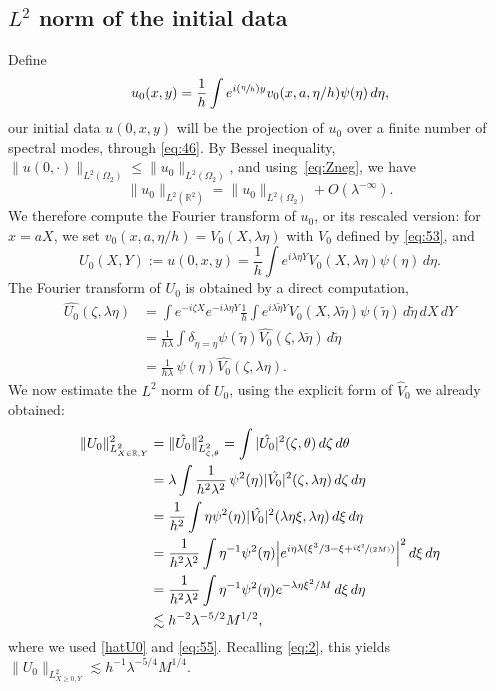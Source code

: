 \documentclass[JEP,XML,SOM,Unicode,NoEqCountersInSection,NoFloatCountersInSection,published]{cedram}
\newcommand{\Psfrac}[2]{(\sfrac{#1}{#2})}
\newcommand{\spfrac}[2]{\sfrac{#1}{(#2)}}
\newcommand\R{{\mathbb R}}
\theoremstyle{plain}
\theoremstyle{definition}
\begin{document}
\subsection{$L^2$ norm of the initial data}
Define
\[
u_{0}(x,y)=\frac 1h\int e^{i\Psfrac{\eta}{h}y}v_0(x,a,\eta/h)\psi(\eta)\,d\eta,
\]
our initial data $u(0,x,y)$ will be the projection of $u_{0}$ over a finite number of spectral modes, through \eqref{eq:46}. By Bessel inequality, $\| u(0,\cdot)\|_{L^{2}(\Omega_{2})} \leq \| u_{0}\|_{L^{2}(\Omega_{2})}$, and using~\eqref{eq:Zneg}, we have
\begin{equation}
\label{eq:2}
\|u_{0}\|_{L^{2}(\R^{2})}=\| u_{0}\|_{L^{2}(\Omega_{2})}+O(\lambda^{-\infty}).
\end{equation}
We therefore compute the Fourier transform of $u_{0}$, or its rescaled version: for $x=aX$, we set $v_0(x,a,\eta/h)=V_0(X,\lambda\eta)$ with $V_{0}$ defined by \eqref{eq:53}, and
\[
U_0(X,Y):=u(0,x,y)=\frac 1h \int e^{i\lambda \eta Y}V_0(X,\lambda \eta)\psi(\eta)\,d\eta.
\]
The Fourier transform of $U_0$ is obtained by a direct computation,
\begin{equation}\label{hatU0}\begin{split}
\hat{U_0}(\zeta,\lambda\eta) & =\int e^{-i\zeta X} e^{-i\lambda\eta Y}\frac 1h \int e^{i\lambda \tilde \eta Y}V_0(X,\lambda \tilde \eta)\psi(\tilde\eta)\,d\tilde\eta \,dX \,dY\\
& =\frac{1}{h\lambda}\int \delta_{\tilde\eta=\eta}\psi(\tilde\eta)\hat{V_0}(\zeta,\lambda\tilde\eta)\,d\tilde\eta\\
& =\frac{1}{h\lambda}\,\psi(\eta)\hat{V_0}(\zeta,\lambda\eta).
\end{split}\end{equation}
We now estimate the $L^2$ norm of $U_0$, using the explicit form of $\hat V_{0}$ we already obtained:%
\begin{equation}
\label{eq:56}
\begin{split}
\|U_{0}\|^2_{L^{2}_{X\in\mathbb{R},Y}} & = \|\hat{U_{0}}\|^2_{L^{2}_{\zeta,\theta}}=\int |\hat{U_0}|^2(\zeta,\theta)\,d\zeta \,d\theta\\
& =\lambda \int \frac{1}{h^2\lambda^2}\,\psi^2(\eta)|\hat{V_0}|^2(\zeta,\lambda\eta)\,d\zeta \,d\eta\\
& =\frac{1}{h^2}\int \eta\psi^2(\eta)|\hat{V_0}|^2(\lambda\eta\xi,\lambda\eta)\,d\xi \,d\eta\\
& =\frac{1}{h^2\lambda^2}\int \eta^{-1}\psi^2(\eta)\Big|e^{i\eta\lambda(\xi^{3}/3-\xi+\spfrac{i\xi^{2}}{2M})}\Big|^2\,d\xi \,d\eta\\
& = \frac{1}{h^2\lambda^2}\int \eta^{-1}\psi^2(\eta) e^{-\lambda \eta\xi^2/M} \,d\xi \,d\eta\\
& \lesssim h^{-2}\lambda^{-5/2} M^{1/2},
\end{split}
\end{equation}
where we used \eqref{hatU0} and \eqref{eq:55}. Recalling \eqref{eq:2}, this yields $ \|U_{0}\|_{L^{2}_{X\geq 0,Y}}\lesssim h^{-1}\lambda^{-5/4}M^{1/4}$.
\end{document}
